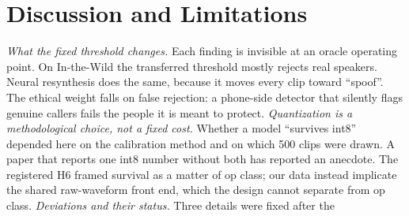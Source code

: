 \documentclass[journal]{IEEEtran}
\begin{document}
\section{Discussion and Limitations}
\label{sec:discussion}
%
\emph{What the fixed threshold changes.} Each finding is invisible at an oracle
operating point. On In-the-Wild the transferred threshold mostly rejects real
speakers. Neural resynthesis does the same, because it moves every clip toward
``spoof''. The ethical weight falls on false rejection: a phone-side detector
that silently flags genuine callers fails the people it is meant to protect.
\emph{Quantization is a methodological choice, not a fixed cost.} Whether a
model ``survives int8'' depended here on the calibration method and on which
500 clips were drawn. A paper that reports one int8 number without both has
reported an anecdote. The registered H6 framed survival as a matter of op class;
our data instead implicate the shared raw-waveform front end, which the design
cannot separate from op class.
\emph{Deviations and their status.} Three details were fixed after the
\end{document}

